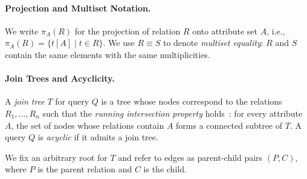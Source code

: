 \documentclass[sigconf]{acmart}
\renewcommand{\emph}[1]{\textit{#1}}
\begin{document}
\paragraph{Projection and Multiset Notation.}
We write $\pi_A(R)$ for the projection of relation $R$ onto attribute set $A$, i.e., $\pi_A(R) = \{t[A] \mid t \in R\}$. We use $R \equiv S$ to denote \emph{multiset equality}: $R$ and $S$ contain the same elements with the same multiplicities.

\vspace{-0.1in}
\paragraph{Join Trees and Acyclicity.}
A \emph{join tree} $T$ for query $Q$ is a tree whose nodes correspond to the relations $R_1, \dots, R_n$ such that the \emph{running intersection property} holds~\cite{beeri1983desirability}: for every attribute $A$, the set of nodes whose relations contain $A$ forms a connected subtree of $T$. A query $Q$ is \emph{acyclic} if it admits a join tree.

We fix an arbitrary root for $T$ and refer to edges as parent-child pairs $(P, C)$, where $P$ is the parent relation and $C$ is the child. 


\end{document}
